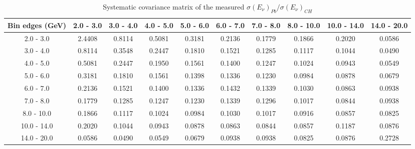 \documentclass[aps,prl,twocolumn,superscriptaddress,nofootinbib]{revtex4-1}
\begin{document}
\begin{table}[h!]
  \centering
  \caption{Systematic covariance matrix of the measured $\sigma(E_{\nu})_{Pb}/\sigma(E_{\nu})_{CH}$}
    \begin{tabular}{c||ccccccccc}
      Bin edges (GeV) & 2.0 - 3.0 & 3.0 - 4.0 & 4.0 - 5.0 & 5.0 - 6.0 & 6.0 - 7.0 & 7.0 - 8.0 & 8.0 - 10.0 & 10.0 - 14.0 & 14.0 - 20.0 \\
\hline \hline
        2.0 - 3.0 &  2.4408 &  0.8114 &  0.5081 &  0.3181 &  0.2136 &  0.1779 &  0.1866 &  0.2020 &  0.0586 \\
        3.0 - 4.0 &  0.8114 &  0.3548 &  0.2447 &  0.1810 &  0.1521 &  0.1285 &  0.1117 &  0.1044 &  0.0490 \\
        4.0 - 5.0 &  0.5081 &  0.2447 &  0.1950 &  0.1561 &  0.1400 &  0.1247 &  0.1024 &  0.0943 &  0.0549 \\
        5.0 - 6.0 &  0.3181 &  0.1810 &  0.1561 &  0.1398 &  0.1336 &  0.1230 &  0.0984 &  0.0878 &  0.0679 \\
        6.0 - 7.0 &  0.2136 &  0.1521 &  0.1400 &  0.1336 &  0.1432 &  0.1339 &  0.1030 &  0.0863 &  0.0938 \\
        7.0 - 8.0 &  0.1779 &  0.1285 &  0.1247 &  0.1230 &  0.1339 &  0.1296 &  0.1017 &  0.0844 &  0.0938 \\
       8.0 - 10.0 &  0.1866 &  0.1117 &  0.1024 &  0.0984 &  0.1030 &  0.1017 &  0.0916 &  0.0857 &  0.0825 \\
      10.0 - 14.0 &  0.2020 &  0.1044 &  0.0943 &  0.0878 &  0.0863 &  0.0844 &  0.0857 &  0.1187 &  0.0876 \\
      14.0 - 20.0 &  0.0586 &  0.0490 &  0.0549 &  0.0679 &  0.0938 &  0.0938 &  0.0825 &  0.0876 &  0.2728 \\
    \end{tabular}
  \label{tablecov:Pb_Systematic_Enu}
\end{table}
\end{document}
